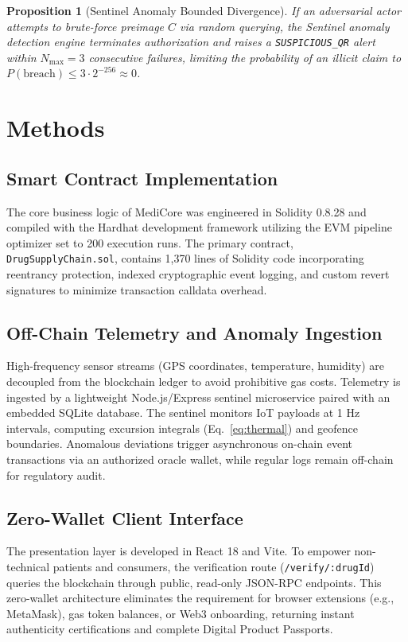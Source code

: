 \documentclass[11pt,a4paper]{article}
\newtheorem{proposition}[theorem]{Proposition}
\begin{document}
\begin{proposition}[Sentinel Anomaly Bounded Divergence]
If an adversarial actor attempts to brute-force preimage $C$ via random querying, the Sentinel anomaly detection engine terminates authorization and raises a \texttt{SUSPICIOUS\_QR} alert within $N_{\text{max}} = 3$ consecutive failures, limiting the probability of an illicit claim to $P(\text{breach}) \le 3 \cdot 2^{-256} \approx 0$.
\end{proposition}

\section{Methods}

\subsection{Smart Contract Implementation}
The core business logic of MediCore was engineered in Solidity 0.8.28 and compiled with the Hardhat development framework utilizing the EVM pipeline optimizer set to 200 execution runs. The primary contract, \texttt{DrugSupplyChain.sol}, contains 1,370 lines of Solidity code incorporating reentrancy protection, indexed cryptographic event logging, and custom revert signatures to minimize transaction calldata overhead.

\subsection{Off-Chain Telemetry and Anomaly Ingestion}
High-frequency sensor streams (GPS coordinates, temperature, humidity) are decoupled from the blockchain ledger to avoid prohibitive gas costs. Telemetry is ingested by a lightweight Node.js/Express sentinel microservice paired with an embedded SQLite database. The sentinel monitors IoT payloads at 1 Hz intervals, computing excursion integrals (Eq.~\ref{eq:thermal}) and geofence boundaries. Anomalous deviations trigger asynchronous on-chain event transactions via an authorized oracle wallet, while regular logs remain off-chain for regulatory audit.

\subsection{Zero-Wallet Client Interface}
The presentation layer is developed in React 18 and Vite. To empower non-technical patients and consumers, the verification route (\texttt{/verify/:drugId}) queries the blockchain through public, read-only JSON-RPC endpoints. This zero-wallet architecture eliminates the requirement for browser extensions (e.g., MetaMask), gas token balances, or Web3 onboarding, returning instant authenticity certifications and complete Digital Product Passports.
\end{document}
